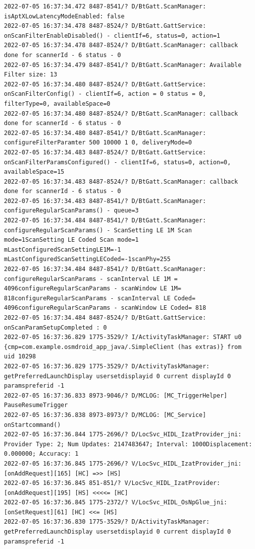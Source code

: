 \documentclass[a4paper,12pt]{book}
\begin{document}
\begin{lstlisting}
2022-07-05 16:37:34.472 8487-8541/? D/BtGatt.ScanManager: isAptXLowLatencyModeEnabled: false
2022-07-05 16:37:34.478 8487-8524/? D/BtGatt.GattService: onScanFilterEnableDisabled() - clientIf=6, status=0, action=1
2022-07-05 16:37:34.478 8487-8524/? D/BtGatt.ScanManager: callback done for scannerId - 6 status - 0
2022-07-05 16:37:34.479 8487-8541/? D/BtGatt.ScanManager: Available Filter size: 13
2022-07-05 16:37:34.480 8487-8524/? D/BtGatt.GattService: onScanFilterConfig() - clientIf=6, action = 0 status = 0, filterType=0, availableSpace=0
2022-07-05 16:37:34.480 8487-8524/? D/BtGatt.ScanManager: callback done for scannerId - 6 status - 0
2022-07-05 16:37:34.480 8487-8541/? D/BtGatt.ScanManager: configureFilterParamter 500 10000 1 0, deliveryMode=0
2022-07-05 16:37:34.483 8487-8524/? D/BtGatt.GattService: onScanFilterParamsConfigured() - clientIf=6, status=0, action=0, availableSpace=15
2022-07-05 16:37:34.483 8487-8524/? D/BtGatt.ScanManager: callback done for scannerId - 6 status - 0
2022-07-05 16:37:34.483 8487-8541/? D/BtGatt.ScanManager: configureRegularScanParams() - queue=3
2022-07-05 16:37:34.484 8487-8541/? D/BtGatt.ScanManager: configureRegularScanParams() - ScanSetting LE 1M Scan mode=1ScanSetting LE Coded Scan mode=1 mLastConfiguredScanSettingLE1M=-1 mLastConfiguredScanSettingLECoded=-1scanPhy=255
2022-07-05 16:37:34.484 8487-8541/? D/BtGatt.ScanManager: configureRegularScanParams - scanInterval LE 1M = 4096configureRegularScanParams - scanWindow LE 1M= 818configureRegularScanParams - scanInterval LE Coded= 4096configureRegularScanParams - scanWindow LE Coded= 818
2022-07-05 16:37:34.484 8487-8524/? D/BtGatt.GattService: onScanParamSetupCompleted : 0
2022-07-05 16:37:36.829 1775-3529/? I/ActivityTaskManager: START u0 {cmp=com.example.osmdroid_app_java/.SimpleClient (has extras)} from uid 10298
2022-07-05 16:37:36.829 1775-3529/? D/ActivityTaskManager: getPreferredLaunchDisplay usersetdisplayid 0 current displayId 0 paramspreferid -1
2022-07-05 16:37:36.833 8973-9046/? D/MCLOG: [MC_TriggerHelper] PauseResumeTrigger
2022-07-05 16:37:36.838 8973-8973/? D/MCLOG: [MC_Service] onStartcommand()
2022-07-05 16:37:36.844 1775-2696/? D/LocSvc_HIDL_IzatProvider_jni: Provider Type: 2; Num Updates: 2147483647; Interval: 1000Displacement: 0.000000; Accuracy: 1
2022-07-05 16:37:36.845 1775-2696/? V/LocSvc_HIDL_IzatProvider_jni: [onAddRequest][165] [HC] =>> [HS]
2022-07-05 16:37:36.845 851-851/? V/LocSvc_HIDL_IzatProvider: [onAddRequest][195] [HS] <<<<= [HC]
2022-07-05 16:37:36.845 1775-2372/? V/LocSvc_HIDL_OsNpGlue_jni: [onSetRequest][61] [HC] <<= [HS]
2022-07-05 16:37:36.830 1775-3529/? D/ActivityTaskManager: getPreferredLaunchDisplay usersetdisplayid 0 current displayId 0 paramspreferid -1

\end{lstlisting}
\end{document}
